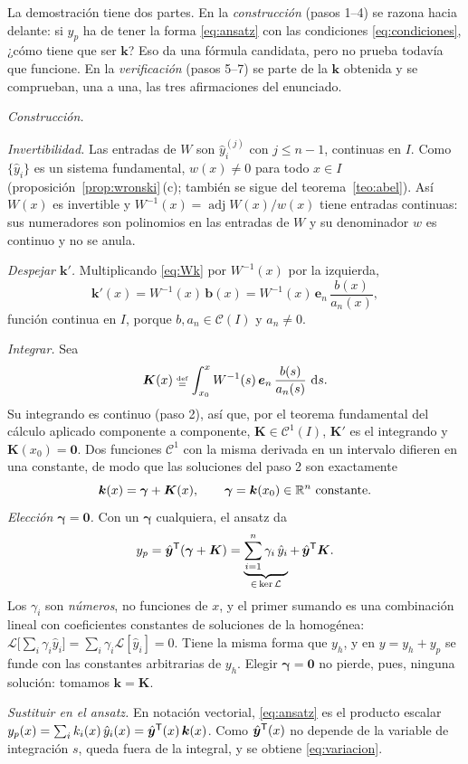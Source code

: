 \documentclass[11pt,twoside]{article}
\newcommand\Lop{\mathcal L}
\newcommand\yh{\hat y}
\newcommand\vyh{\hat{\bm y}}
\newcommand\Cl{\mathcal C}
\newcommand\vk{\bm k}
\newcommand\vb{\bm b}
\newcommand\ve{\bm e}
\newcommand\vK{\bm K}
\newcommand\vgamma{\bm\gamma}
\begin{document}
\begin{demostracion}
La demostración tiene dos partes. En la \emph{construcción} (pasos 1--4) se razona hacia delante: si $y_p$ ha de tener
la forma \eqref{eq:ansatz} con las condiciones \eqref{eq:condiciones}, ¿cómo tiene que ser $\vk$? Eso da una fórmula
candidata, pero no prueba todavía que funcione. En la \emph{verificación} (pasos 5--7) se parte de la $\vk$ obtenida y se
comprueban, una a una, las tres afirmaciones del enunciado.

\emph{Construcción.}
\begin{pasos}
\item \emph{Invertibilidad.} Las entradas de $W$ son $\yh_i^{(j)}$ con $j\le n-1$, continuas en $I$. Como $\{\yh_i\}$ es un
sistema fundamental, $w(x)\neq0$ para todo $x\in I$ (proposición~\ref{prop:wronski}\,(c); también se sigue del
teorema~\ref{teo:abel}). Así $W(x)$ es invertible y $W^{-1}(x)=\operatorname{adj}W(x)/w(x)$ tiene entradas continuas: sus
numeradores son polinomios en las entradas de $W$ y su denominador $w$ es continuo y no se anula.
\item \emph{Despejar $\vk'$.} Multiplicando \eqref{eq:Wk} por $W^{-1}(x)$ por la izquierda,
\begin{equation*}
\vk'(x)=W^{-1}(x)\,\vb(x)=W^{-1}(x)\,\ve_n\,\frac{b(x)}{a_n(x)},
\end{equation*}
función continua en $I$, porque $b,a_n\in\Cl(I)$ y $a_n\neq0$.
\item \emph{Integrar.} Sea
\begin{equation*}
\vK(x)\defeq\int_{x_0}^{x}W^{-1}(s)\,\ve_n\,\frac{b(s)}{a_n(s)}\,\dd s.
\end{equation*}
Su integrando es continuo (paso 2), así que, por el teorema fundamental del cálculo aplicado componente a componente,
$\vK\in\Cl^1(I)$, $\vK'$ es el integrando y $\vK(x_0)=\bm0$. Dos funciones $\Cl^1$ con la misma derivada en un intervalo
difieren en una constante, de modo que las soluciones del paso 2 son exactamente
\begin{equation*}
\vk(x)=\vgamma+\vK(x),\qquad\vgamma=\vk(x_0)\in\R^n\ \text{constante}.
\end{equation*}
\emph{Elección $\vgamma=\bm0$.} Con un $\vgamma$ cualquiera, el ansatz da
\begin{equation*}
y_p=\vyh\T(\vgamma+\vK)=\underbrace{\sum_{i=1}^{n}\gamma_i\,\yh_i}_{\in\,\ker\Lop}+\,\vyh\T\vK.
\end{equation*}
Los $\gamma_i$ son \emph{números}, no funciones de $x$, y el primer sumando es una combinación lineal con coeficientes
constantes de soluciones de la homogénea: $\Lop\big[\sum_i\gamma_i\yh_i\big]=\sum_i\gamma_i\Lop[\yh_i]=0$. Tiene la misma forma
que $y_h$, y en $y=y_h+y_p$ se funde con las constantes arbitrarias de $y_h$. Elegir $\vgamma=\bm0$ no pierde, pues,
ninguna solución: tomamos $\vk=\vK$.
\item \emph{Sustituir en el ansatz.} En notación vectorial, \eqref{eq:ansatz} es el producto escalar
$y_p(x)=\sum_ik_i(x)\,\yh_i(x)=\allowbreak\vyh\T(x)\,\vk(x)$. Como $\vyh\T(x)$ no depende de la variable de integración $s$, queda fuera
de la integral, y se obtiene \eqref{eq:variacion}.
\end{pasos}


\end{demostracion}
\end{document}
